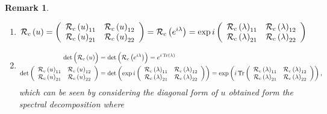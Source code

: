 \documentclass[aps,preprint]{revtex4}%
\newtheorem{remark}[theorem]{Remark}
\begin{document}
\begin{remark}
\begin{enumerate}
\item
\begin{equation}
\mathcal{R}_{c}\left(  u\right)  =\left(
\begin{array}
[c]{cc}%
\mathcal{R}_{c}\left(  u\right)  _{11} & \mathcal{R}_{c}\left(  u\right)
_{12}\\
\mathcal{R}_{c}\left(  u\right)  _{21} & \mathcal{R}_{c}\left(  u\right)
_{22}%
\end{array}
\right)  =\mathcal{R}_{c}\left(  e^{i\lambda}\right)  =\exp i\left(
\begin{array}
[c]{cc}%
\mathcal{R}_{c}\left(  \lambda\right)  _{11} & \mathcal{R}_{c}\left(
\lambda\right)  _{12}\\
\mathcal{R}_{c}\left(  \lambda\right)  _{21} & \mathcal{R}_{c}\left(
\lambda\right)  _{22}%
\end{array}
\right)
\end{equation}


\item
\begin{align}
\det\left(  \overset{}{\mathcal{R}_{c}\left(  u\right)  }\right)   &
=\det\left(  \overset{}{\mathcal{R}_{c}\left(  e^{i\lambda}\right)  }\right)
=e^{i\operatorname*{Tr}\left(  \lambda\right)  }\\
\det\left(
\begin{array}
[c]{cc}%
\mathcal{R}_{c}\left(  u\right)  _{11} & \mathcal{R}_{c}\left(  u\right)
_{12}\\
\mathcal{R}_{c}\left(  u\right)  _{21} & \mathcal{R}_{c}\left(  u\right)
_{22}%
\end{array}
\right)   &  =\det\left(  \exp i\left(
\begin{array}
[c]{cc}%
\mathcal{R}_{c}\left(  \lambda\right)  _{11} & \mathcal{R}_{c}\left(
\lambda\right)  _{12}\\
\mathcal{R}_{c}\left(  \lambda\right)  _{21} & \mathcal{R}_{c}\left(
\lambda\right)  _{22}%
\end{array}
\right)  \right)  =\exp\left(  i\operatorname*{Tr}\left(
\begin{array}
[c]{cc}%
\mathcal{R}_{c}\left(  \lambda\right)  _{11} & \mathcal{R}_{c}\left(
\lambda\right)  _{12}\\
\mathcal{R}_{c}\left(  \lambda\right)  _{21} & \mathcal{R}_{c}\left(
\lambda\right)  _{22}%
\end{array}
\right)  \right)  ,
\end{align}
which can be seen by considering the diagonal form of $u$ obtained form the
spectral decomposition where


\end{enumerate}
\end{remark}
\end{document}
